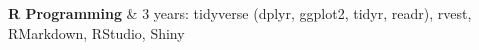 \textbf{R Programming} & 
3 years: 
tidyverse (dplyr, ggplot2, tidyr, readr), 
rvest, 
RMarkdown, 
RStudio, 
Shiny 